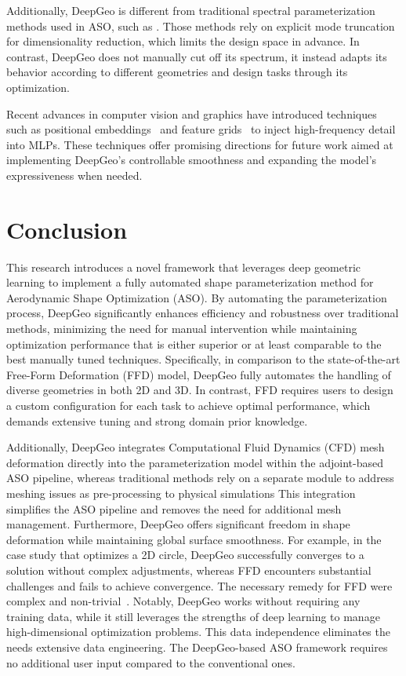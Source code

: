 

Additionally, DeepGeo is different from traditional spectral parameterization methods used in ASO, such as \citet{aa.Li2019c,aa.Li2021c}. Those methods rely on explicit mode truncation for dimensionality reduction, which limits the design space in advance. In contrast, DeepGeo does not manually cut off its spectrum, it instead adapts its behavior according to different geometries and design tasks through its optimization.

Recent advances in computer vision and graphics have introduced techniques such as positional embeddings~\cite{ai.Vaswani2017} and feature grids~\cite{ai.Mueller2022} to inject high-frequency detail into MLPs. These techniques offer promising directions for future work aimed at implementing DeepGeo’s controllable smoothness and expanding the model's expressiveness when needed.

\section{Conclusion}
This research introduces a novel framework that leverages deep geometric learning to implement a fully automated shape parameterization method for Aerodynamic Shape Optimization (ASO).
By automating the parameterization process, DeepGeo significantly enhances efficiency and robustness over traditional methods, minimizing the need for manual intervention while maintaining optimization performance that is either superior or at least comparable to the best manually tuned techniques.
Specifically, in comparison to the state-of-the-art Free-Form Deformation (FFD) model, DeepGeo fully automates the handling of diverse geometries in both 2D and 3D. In contrast, FFD requires users to design a custom configuration for each task to achieve optimal performance, which demands extensive tuning and strong domain prior knowledge.

Additionally, DeepGeo integrates Computational Fluid Dynamics (CFD) mesh deformation directly into the parameterization model within the adjoint-based ASO pipeline, whereas traditional methods rely on a separate module to address meshing issues as pre-processing to physical simulations
This integration simplifies the ASO pipeline and removes the need for additional mesh management.
Furthermore, DeepGeo offers significant freedom in shape deformation while maintaining global surface smoothness. For example, in the case study that optimizes a 2D circle, DeepGeo successfully converges to a solution without complex adjustments, whereas FFD encounters substantial challenges and fails to achieve convergence. The necessary remedy for FFD were complex and non-trivial~\cite{aa.He2019}.
Notably, DeepGeo works without requiring any training data, while it still leverages the strengths of deep learning to manage high-dimensional optimization problems.
This data independence eliminates the needs extensive data engineering.
The DeepGeo-based ASO framework requires no additional user input compared to the conventional ones.

